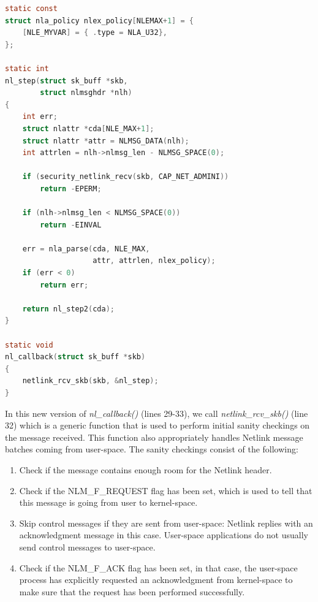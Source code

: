 \documentclass[10pt,onecolumn]{article}
\begin{document}
\begin{lstlisting}[language=C, caption=Extending the nl\_callback function, label=listing2]
static const
struct nla_policy nlex_policy[NLEMAX+1] = {
    [NLE_MYVAR] = { .type = NLA_U32},
};

static int
nl_step(struct sk_buff *skb,
        struct nlmsghdr *nlh)
{
    int err;
    struct nlattr *cda[NLE_MAX+1];
    struct nlattr *attr = NLMSG_DATA(nlh);
    int attrlen = nlh->nlmsg_len - NLMSG_SPACE(0);

    if (security_netlink_recv(skb, CAP_NET_ADMINI))
        return -EPERM;

    if (nlh->nlmsg_len < NLMSG_SPACE(0))
        return -EINVAL

    err = nla_parse(cda, NLE_MAX,
                    attr, attrlen, nlex_policy);
    if (err < 0)
        return err;

    return nl_step2(cda);
}

static void
nl_callback(struct sk_buff *skb)
{
    netlink_rcv_skb(skb, &nl_step);
}
\end{lstlisting}

In this new version of \textit{nl\_callback()} (lines 29-33), we call \textit{netlink\_rcv\_skb()} (line 32) which is a generic function that is used to perform initial sanity checkings on the message received. This function also appropriately handles Netlink message batches coming from user-space. The sanity checkings consist of the following:

\begin{enumerate}
  \item Check if the message contains enough room for the Netlink header.
  \item Check if the NLM\_F\_REQUEST flag has been set, which is used to tell that this message is going from user to kernel-space.
  \item Skip control messages if they are sent from user-space: Netlink replies with an acknowledgment message in this case. User-space applications do not usually send control messages to user-space.
  \item Check if the NLM\_F\_ACK flag has been set, in that case, the user-space process has explicitly requested an acknowledgment from kernel-space to make sure that the request has been performed successfully.
\end{enumerate}
\end{document}
